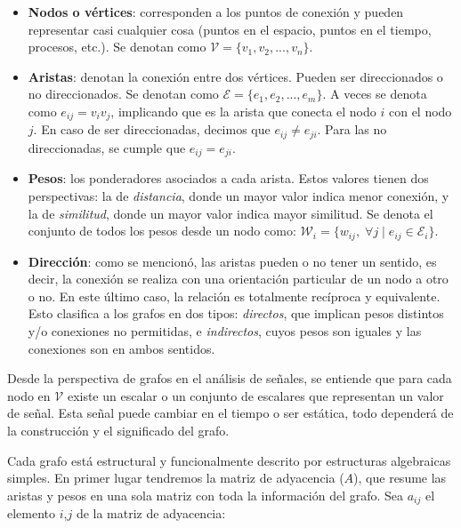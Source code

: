     \begin{itemize}
        \item \textbf{Nodos o vértices}: corresponden a los puntos de conexión y pueden representar casi cualquier cosa (puntos en el espacio, puntos en el tiempo, procesos, etc.). Se denotan como $\mathcal{V} = \{v_1,v_2,...,v_n\}$.
        \item \textbf{Aristas}: denotan la conexión entre dos vértices. Pueden ser direccionados o no direccionados. Se denotan como $\mathcal{E} = \{e_1,e_2,...,e_m\}$. A veces se denota como $e_{ij} = v_i v_j$, implicando que es la arista que conecta el nodo $i$ con el nodo $j$. En caso de ser direccionadas, decimos que $e_{ij} \neq e_{ji}$. Para las no direccionadas, se cumple que $e_{ij} = e_{ji}$.
        \item \textbf{Pesos}: los ponderadores asociados a cada arista. Estos valores tienen dos perspectivas: la de \textit{distancia}, donde un mayor valor indica menor conexión, y la de \textit{similitud}, donde un mayor valor indica mayor similitud. Se denota el conjunto de todos los pesos desde un nodo como: $\mathcal{W}_i = \{w_{ij}, \; \forall j \; | \; e_{ij} \in \mathcal{E}_i \}$.
        \item \textbf{Dirección}: como se mencionó, las aristas pueden o no tener un sentido, es decir, la conexión se realiza con una orientación particular de un nodo a otro o no. En este último caso, la relación es totalmente recíproca y equivalente. Esto clasifica a los grafos en dos tipos: \textit{directos}, que implican pesos distintos y/o conexiones no permitidas, e \textit{indirectos}, cuyos pesos son iguales y las conexiones son en ambos sentidos.
    \end{itemize}

    Desde la perspectiva de grafos en el análisis de señales, se entiende que para cada nodo en $\mathcal{V}$ existe un escalar o un conjunto de escalares que representan un valor de señal. Esta señal puede cambiar en el tiempo o ser estática, todo dependerá de la construcción y el significado del grafo. %
    
    Cada grafo está estructural y funcionalmente descrito por estructuras algebraicas simples. En primer lugar tendremos la matriz de adyacencia ($A$), que resume las aristas y pesos en una sola matriz con toda la información del grafo. Sea $a_{ij}$ el elemento $i$,$j$ de la matriz de adyacencia:

